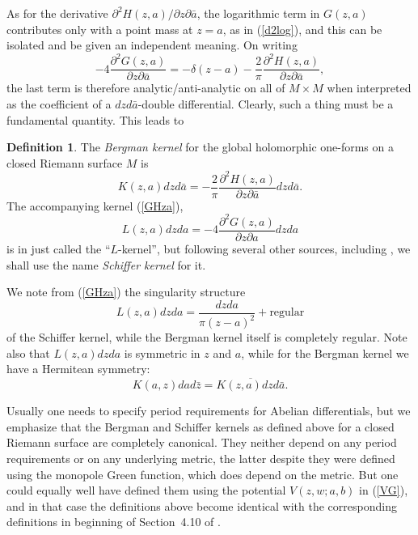 \documentclass[reqno,12pt]{article}
\theoremstyle{plain}
\theoremstyle{definition}
\newtheorem{definition}{Definition}[section]
\numberwithin{equation}{section}
\numberwithin{figure}{section}
\begin{document}
As for  the derivative $\partial^2 H(z,a)/\partial z\partial \bar{a}$, 
the logarithmic term in $G(z,a)$ contributes only with a point mass at $z=a$, as in (\ref{d2log}), 
and this can be isolated and be given an independent meaning. On writing
\begin{equation}\label{HGza}
-4\frac{\partial^2 G(z,a)}{\partial z\partial \bar{a}}
=-\delta(z-a)-\frac{2}{\pi} \frac{\partial^2 H(z,a)}{\partial z\partial \bar{a}},
\end{equation}
the last term is therefore analytic/anti-analytic on all of $M\times M$ when interpreted as the coefficient of a $dzd\bar{a}$-double differential.
Clearly, such a thing must be a fundamental quantity.  This leads to
\begin{definition}\label{def:Bergman and Schiffer}
The {\it Bergman kernel} for the global holomorphic one-forms on a closed Riemann surface $M$ is
\begin{equation}\label{K}
K(z,a)dzd\bar{a}=-\frac{2}{\pi}\frac{\partial^2 H(z,a)}{\partial z \partial\bar{a}}dzd\bar{a}.
\end{equation}
The accompanying kernel (\ref{GHza}),
\begin{equation}\label{L}
L(z,a)dzda=-4\frac{\partial^2 G(z,a)}{\partial z\partial {a}}dzda
\end{equation}
is in \cite{Schiffer-Spencer-1954} just called the ``$L$-kernel'', but following several other sources, 
including \cite{Takhtajan-2001, Wolpert-2018}, we shall use the name {\it Schiffer kernel} for it. 
\end{definition}

We note from (\ref{GHza}) the singularity structure 
\begin{equation}\label{singularityL}
L(z,a)dzda=\frac{dzda}{\pi(z-a)^2}+\text{regular}
\end{equation}
of the Schiffer kernel, while the Bergman kernel itself is completely regular. 
Note also that $L(z,a)dzda$ is symmetric in $z$ and $a$, while for the Bergman kernel we have
a Hermitean symmetry: 
\begin{equation}\label{symmetryK}
K(a,z)dad\bar{z}=\overline{K(z,a)dzd\bar{a}}.
\end{equation}

Usually one needs to specify period requirements for Abelian differentials, but we
emphasize that the Bergman and Schiffer kernels as defined above for a closed Riemann surface
are completely canonical.  They
neither depend on any period requirements or on any underlying metric, the latter despite they were defined using the monopole Green function,
which does depend on the metric. But one could equally well have defined them using the potential $V(z,w;a,b)$ in (\ref{VG}), and in that case the
definitions above become identical with the corresponding definitions in beginning of Section~4.10 of \cite{Schiffer-Spencer-1954}.
\end{document}
